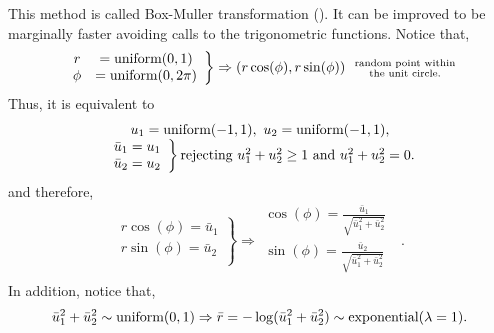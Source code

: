 This method is called Box-Muller transformation (\cite{box1958}). It can be improved to be marginally faster avoiding calls to the trigonometric functions. Notice that,
$$
  \left.
  \begin{array}{cc}
    r &= \textup{uniform}(0,1) \\
    \phi &= \textup{uniform}(0,2\pi) \\
  \end{array}
  \right\} \Rightarrow
  (r\cos(\phi),r\sin(\phi)) \ \ \substack{\text{random point within} \\ \text{the unit circle.}}  
$$
Thus, it is equivalent to
\begin{equation*}
  \begin{array}{c}
    u_1 = \textup{uniform}(-1,1), \ u_2 = \textup{uniform}(-1,1), \\
    \left. \begin{array}{cc}
      \bar{u}_1 = u_1 \\
      \bar{u}_2 = u_2 \\
    \end{array}
    \right\}
    \text{rejecting $u_1^2 + u_2^2 \geq 1$ and $u_1^2 + u_2^2 = 0$.} \\
  \end{array}
\end{equation*}
and therefore,
\begin{equation*}
  \left. \begin{array}{c}
    r\cos(\phi) = \bar{u}_1 \\
    r\sin(\phi) = \bar{u}_2 \\
  \end{array} \right\} \Rightarrow
  \begin{array}{c}
    \cos(\phi) = \frac{\bar{u}_1}{\sqrt{\bar{u}_1^2 + \bar{u}_2^2}} \\
    \sin(\phi) = \frac{\bar{u}_2}{\sqrt{\bar{u}_1^2 + \bar{u}_2^2}} \\
  \end{array} 
  \ \ \ . 
\end{equation*}
In addition, notice that, %
$$
  \bar{u}_1^2 + \bar{u}_2^2 \sim \textup{uniform}(0,1) \Rightarrow
  \bar{r} = -\log(\bar{u}_1^2 + \bar{u}_2^2) \sim \textup{exponential}(\lambda = 1).
$$
